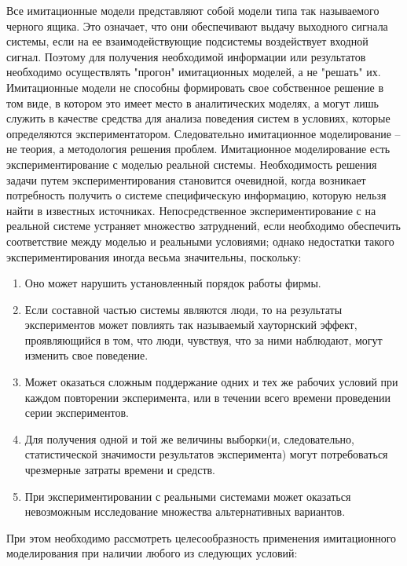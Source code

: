     Все имитационные модели представляют собой модели типа так называемого черного ящика. Это означает, что они обеспечивают выдачу выходного сигнала системы, если на ее взаимодействующие подсистемы воздействует входной сигнал. Поэтому для получения необходимой информации или результатов необходимо осуществлять "прогон" имитационных моделей, а не "решать" их. Имитационные модели не способны формировать свое собственное решение в том виде, в котором это имеет место в аналитических моделях, а могут лишь служить в качестве средства для анализа поведения систем в условиях, которые определяются экспериментатором. Следовательно имитационное моделирование -- не теория, а методология решения проблем.
    Имитационное моделирование есть экспериментирование с моделью реальной системы. Необходимость решения задачи путем экспериментирования становится очевидной, когда возникает потребность получить о системе специфическую информацию, которую нельзя найти в известных источниках. Непосредственное экспериментирование с на реальной системе устраняет множество затруднений, если необходимо обеспечить соответствие между моделью и реальными условиями; однако недостатки такого экспериментирования иногда весьма значительны, поскольку:

\begin{enumerate}
    \item Оно может нарушить установленный порядок работы фирмы.
    \item Если составной частью системы являются люди, то на результаты экспериментов может повлиять так называемый хауторнский эффект, проявляющийся в том, что люди, чувствуя, что за ними наблюдают, могут изменить свое поведение.
    \item Может оказаться сложным поддержание одних и тех же рабочих условий при каждом повторении эксперимента, или в течении всего времени проведении серии экспериментов.
    \item Для получения одной и той же величины выборки(и, следовательно, статистической значимости результатов эксперимента) могут потребоваться чрезмерные затраты времени и средств.
    \item При экспериментировании с реальными системами может оказаться невозможным исследование множества альтернативных вариантов.
\end{enumerate}

    При этом необходимо рассмотреть целесообразность применения имитационного моделирования при наличии любого из следующих условий:

